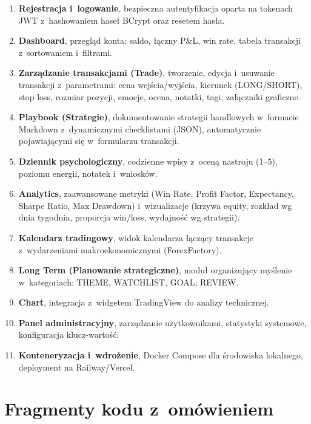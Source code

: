 \documentclass[12pt,a4paper]{article}
\begin{document}
\begin{enumerate}
  \item \textbf{Rejestracja i~logowanie}, bezpieczna autentyfikacja oparta na tokenach JWT z~hashowaniem haseł BCrypt oraz resetem hasła.
  \item \textbf{Dashboard}, przegląd konta: saldo, łączny P\&L, win rate, tabela transakcji z~sortowaniem i~filtrami.
  \item \textbf{Zarządzanie transakcjami (Trade)}, tworzenie, edycja i~usuwanie transakcji z~parametrami: cena wejścia/wyjścia, kierunek (LONG/SHORT), stop loss, rozmiar pozycji, emocje, ocena, notatki, tagi, załączniki graficzne.
  \item \textbf{Playbook (Strategie)}, dokumentowanie strategii handlowych w~formacie Markdown z~dynamicznymi checklistami (JSON), automatycznie pojawiającymi się w~formularzu transakcji.
  \item \textbf{Dziennik psychologiczny}, codzienne wpisy z~oceną nastroju (1--5), poziomu energii, notatek i~wniosków.
  \item \textbf{Analytics}, zaawansowane metryki (Win Rate, Profit Factor, Expectancy, Sharpe Ratio, Max Drawdown) i~wizualizacje (krzywa equity, rozkład wg dnia tygodnia, proporcja win/loss, wydajność wg strategii).
  \item \textbf{Kalendarz tradingowy}, widok kalendarza łączący transakcje z~wydarzeniami makroekonomicznymi (ForexFactory).
  \item \textbf{Long Term (Planowanie strategiczne)}, moduł organizujący myślenie w~kategoriach: THEME, WATCHLIST, GOAL, REVIEW.
  \item \textbf{Chart}, integracja z~widgetem TradingView do analizy technicznej.
  \item \textbf{Panel administracyjny}, zarządzanie użytkownikami, statystyki systemowe, konfiguracja klucz-wartość.
  \item \textbf{Konteneryzacja i~wdrożenie}, Docker Compose dla środowiska lokalnego, deployment na Railway/Vercel.
\end{enumerate}

\section{Fragmenty kodu z~omówieniem}
\end{document}
